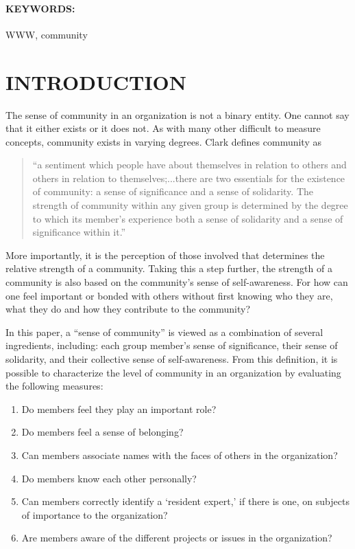 \paragraph{KEYWORDS:} WWW, community

\section{INTRODUCTION}

The sense of community in an organization is not a binary entity.  One cannot
say that it either exists or it does not.  As with many other difficult to
measure concepts, community exists in varying degrees.  Clark \cite{Clark73}
defines community as

\begin{quote}
  ``a sentiment which people have about themselves in relation to others and
  others in relation to themselves;...there are two essentials for the
  existence of community: a sense of significance and a sense of solidarity.
  The strength of community within any given group is determined by the
  degree to which its member's experience both a sense of solidarity and a
  sense of significance within it.''
\end{quote}

More importantly, it is the perception of those involved that determines the
relative strength of a community.  Taking this a step further, the strength of
a community is also based on the community's sense of self-awareness.  For how
can one feel important or bonded with others without first knowing who they
are, what they do and how they contribute to the community?

In this paper, a ``sense of community'' is viewed as a combination of several
ingredients, including: each group member's sense of significance, their sense
of solidarity, and their collective sense of self-awareness.  From this
definition, it is possible to characterize the level of community in an
organization by evaluating the following measures:

\begin{enumerate}
\item{Do members feel they play an important role?}
\item{Do members feel a sense of belonging?}
\item{Can members associate names with the faces of others in the organization?}
\item{Do members know each other personally?}
\item{Can members correctly identify a `resident expert,' if there is one, on
  subjects of importance to the organization?}
\item{Are members aware of the different projects or issues in the
  organization?}
\end{enumerate}

